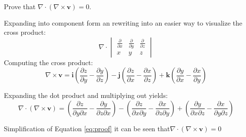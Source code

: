 Prove that $\nabla \cdot \left(\nabla \times \boldsymbol{v}\right)=0$.

Expanding into component form an rewriting into an easier way to visualize the cross product:
\begin{equation}
	\nabla\cdot 
	\begin{vmatrix}
		\frac{\partial}{\partial x} & \frac{\partial}{\partial y} & \frac{\partial}{\partial z}\\
		x&y&z
	\end{vmatrix}
\end{equation}
Computing the cross product:
\begin{equation}
\nabla \times \boldsymbol{v}= \boldsymbol{i}\left(\frac{\partial z}{\partial y}-\frac{\partial y}{\partial z}\right)-\boldsymbol{j}\left(\frac{\partial z}{\partial x}-\frac{\partial x}{\partial z}\right)+\boldsymbol{k}\left(\frac{\partial y}{\partial x}-\frac{\partial x}{\partial y}\right)
\end{equation}

Expanding the dot product and multiplying out yields:
\begin{equation}
\nabla\cdot\left(\nabla \times \boldsymbol{v}\right)= \left(\frac{\partial z}{\partial y \partial x}-\frac{\partial y}{\partial z \partial x}\right)-\left(\frac{\partial z}{\partial x \partial y}-\frac{\partial x}{\partial z \partial y}\right)+\left(\frac{\partial y}{\partial x \partial z}-\frac{\partial x}{\partial y \partial z}\right)
\label{eq:proof}
\end{equation}

Simplification of Equation \ref{eq:proof}  it can be seen that$\nabla \cdot \left(\nabla \times \boldsymbol{v}\right)=0$